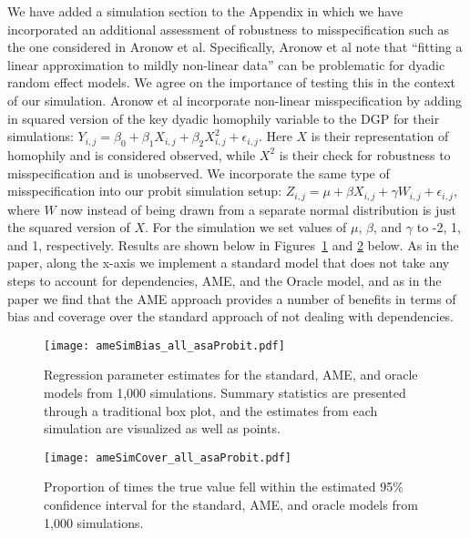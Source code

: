 \begin{enumerate}
\begin{itemize}
{{		We have added a simulation section to the Appendix in which we have incorporated an additional assessment of robustness to misspecification such as the one considered in Aronow et al. Specifically, Aronow et al note that ``fitting a linear approximation to mildly non-linear data'' can be problematic for dyadic random effect models. We agree on the importance of testing this in the context of our simulation. Aronow et al incorporate non-linear misspecification by adding in squared version of the key dyadic homophily variable to the DGP for their simulations: $Y_{i,j} = \beta_{0} + \beta_{1} X_{i,j} + \beta_{2} X_{i,j}^{2} + \epsilon_{i,j}$. Here $X$ is their representation of homophily and is considered observed, while $X^{2}$ is their check for robustness to misspecification and is unobserved. We incorporate the same type of misspecification into our probit simulation setup: $Z_{i,j} =  \mu + \beta X_{i,j} + \gamma W_{i,j} + \epsilon_{i,j}$, where $W$ now instead of being drawn from a separate normal distribution is just the squared version of $X$. For the simulation we set values of $\mu$, $\beta$, and $\gamma$ to -2, 1, and 1, respectively. Results are shown below in Figures~\ref{fig:ameBias_asa} and \ref{fig:ameCalib_asa} below. As in the paper, along the x-axis we implement a standard model that does not take any steps to account for dependencies, AME, and the Oracle model, and as in the paper we find that the AME approach provides a number of benefits in terms of bias and coverage over the standard approach of not dealing with dependencies.
	}}

	\begin{figure}[ht]
		\centering
		\caption{Regression parameter estimates for the standard, AME, and oracle models from 1,000 simulations. Summary statistics are presented through a traditional box plot, and the estimates from each simulation are visualized as well as points.}
		\label{fig:ameBias_asa}
		\texttt{[image: ameSimBias\_all\_asaProbit.pdf]} \\
	\end{figure}

	\begin{figure}[ht]
		\centering
		\caption{Proportion of times the true value fell within the estimated 95\% confidence interval for the standard, AME, and oracle models from 1,000 simulations.}
		\label{fig:ameCalib_asa}
		\texttt{[image: ameSimCover\_all\_asaProbit.pdf]} \\
	\end{figure}

	\end{itemize}
\end{enumerate}

\FloatBarrier
\clearpage
